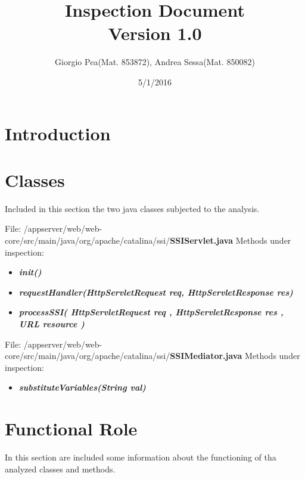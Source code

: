 \documentclass[11pt,titlepage]{article} %
\title{Inspection Document \\ \vspace{1cm} \large{Version 1.0}}
\author{Giorgio Pea(Mat. 853872), Andrea Sessa(Mat. 850082)}
\date{5/1/2016}
\begin{document}
\maketitle

\newpage

\tableofcontents

\newpage

\section{Introduction}

\section{Classes}

Included in this section the two java classes subjected to the analysis.\newline

\noindent File: /appserver/web/web-core/src/main/java/org/apache/catalina/ssi/\textbf{SSIServlet.java}\newline\newline
Methods under inspection:
  \begin{itemize}
    \item \textbf{\textit{init()}}
    \item \textbf{\textit{requestHandler(HttpServletRequest req, HttpServletResponse res)}}
    \item \textbf{\textit{processSSI( HttpServletRequest req , HttpServletResponse res , URL resource )}}
  \end{itemize}

\noindent File: /appserver/web/web-core/src/main/java/org/apache/catalina/ssi/\textbf{SSIMediator.java}\newline\newline
Methods under inspection:
  \begin{itemize}
    \item \textbf{\textit{substituteVariables(String val)}}
  \end{itemize}
  
\newpage


\section{Functional Role}
  In this section are included some information about the functioning of tha analyzed classes and methods.\newline
\end{document}
